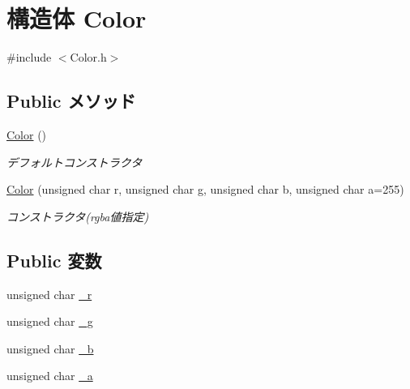 \hypertarget{struct_color}{\section{構造体 Color}
\label{struct_color}
}


{\ttfamily \#include $<$Color.\-h$>$}

\subsection*{Public メソッド}
\begin{DoxyCompactItemize}
\item 
\hyperlink{struct_color_a9a742cbe9f9f4037f5d9f4e81a9b2428}{Color} ()
\begin{DoxyCompactList}\small\item\em デフォルトコンストラクタ \end{DoxyCompactList}\item 
\hyperlink{struct_color_a1f9035eaa8f9eb07c55359e60e895b73}{Color} (unsigned char r, unsigned char g, unsigned char b, unsigned char a=255)
\begin{DoxyCompactList}\small\item\em コンストラクタ(rgba値指定) \end{DoxyCompactList}\end{DoxyCompactItemize}
\subsection*{Public 変数}
\begin{DoxyCompactItemize}
\item 
unsigned char \hyperlink{struct_color_a0c71513f8081799f4d51345bab7b67f8}{\-\_\-r}
\item 
unsigned char \hyperlink{struct_color_a365597f2503cf58a343b48110f0cc254}{\-\_\-g}
\item 
unsigned char \hyperlink{struct_color_a9a9e3820e73e7786817d0e5f314835b4}{\-\_\-b}
\item 
unsigned char \hyperlink{struct_color_af9b0213d8532a292da67d4525b81a6ec}{\-\_\-a}
\end{DoxyCompactItemize}

